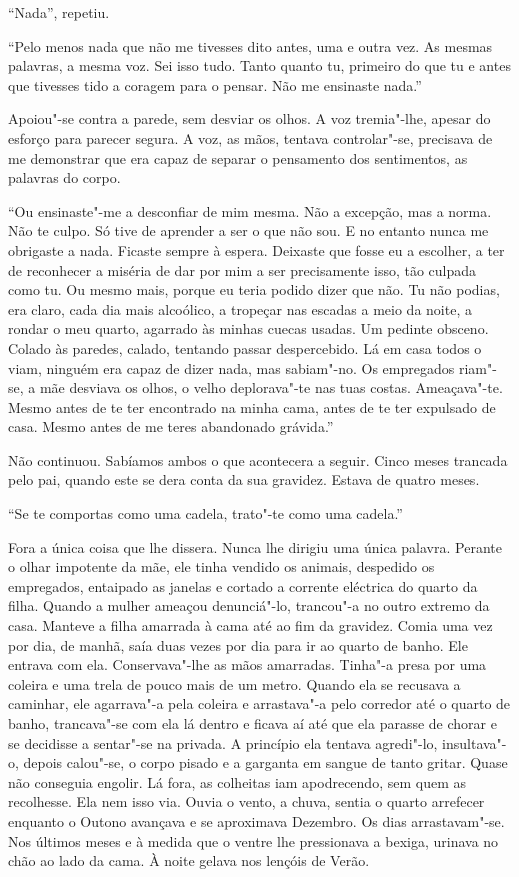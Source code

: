 ``Nada'',
repetiu.

``Pelo menos nada que não me tivesses dito antes, uma e outra vez. As
mesmas palavras, a mesma voz. Sei isso tudo. Tanto quanto tu, primeiro
do que tu e antes que tivesses tido a coragem para o pensar. Não me
ensinaste nada.''

Apoiou"-se contra a parede, sem desviar os olhos. A voz tremia"-lhe,
apesar do esforço para parecer segura. A voz, as mãos, tentava
controlar"-se, precisava de me demonstrar que era capaz de separar o
pensamento dos sentimentos, as palavras do corpo.

``Ou ensinaste"-me a desconfiar de mim mesma. Não a excepção, mas a
norma. Não te culpo. Só tive de aprender a ser o que não sou. E no
entanto nunca me obrigaste a nada. Ficaste sempre à espera. Deixaste que
fosse eu a escolher, a ter de reconhecer a miséria de dar por mim a ser
precisamente isso, tão culpada como tu. Ou mesmo mais, porque eu teria
podido dizer que não. Tu não podias, era claro, cada dia mais alcoólico,
a tropeçar nas escadas a meio da noite, a rondar o meu quarto, agarrado
às minhas cuecas usadas. Um pedinte obsceno. Colado às paredes, calado,
tentando passar despercebido. Lá em casa todos o viam, ninguém era capaz
de dizer nada, mas sabiam"-no. Os empregados riam"-se, a mãe desviava os
olhos, o velho deplorava"-te nas tuas costas. Ameaçava"-te. Mesmo antes
de te ter encontrado na minha cama, antes de te ter expulsado de casa.
Mesmo antes de me teres abandonado grávida.''

Não continuou. Sabíamos ambos o que acontecera a seguir. Cinco meses
trancada pelo pai, quando este se dera conta da sua gravidez. Estava de
quatro meses.

``Se te comportas como uma cadela, trato"-te como uma cadela.''

Fora a única coisa que lhe dissera. Nunca lhe dirigiu uma única palavra.
Perante o olhar impotente da mãe, ele tinha vendido os animais,
despedido os empregados, entaipado as janelas e cortado a corrente
eléctrica do quarto da filha. Quando a mulher ameaçou denunciá"-lo,
trancou"-a no outro extremo da casa. Manteve a filha amarrada à cama até
ao fim da gravidez. Comia uma vez por dia, de manhã, saía duas vezes por
dia para ir ao quarto de banho. Ele entrava com ela. Conservava"-lhe as
mãos amarradas. Tinha"-a presa por uma coleira e uma trela de pouco mais
de um metro. Quando ela se recusava a caminhar, ele agarrava"-a pela
coleira e arrastava"-a pelo corredor até o quarto de banho,
trancava"-se com ela lá dentro e ficava aí até que ela parasse de chorar
e se decidisse a sentar"-se na privada. A princípio ela tentava
agredi"-lo, insultava"-o, depois calou"-se, o corpo pisado e a garganta
em sangue de tanto gritar. Quase não conseguia engolir. Lá fora, as
colheitas iam apodrecendo, sem quem as recolhesse. Ela nem isso via.
Ouvia o vento, a chuva, sentia o quarto arrefecer enquanto o Outono
avançava e se aproximava Dezembro. Os dias arrastavam"-se. Nos últimos
meses e à medida que o ventre lhe pressionava a bexiga, urinava no chão
ao lado da cama. À noite gelava nos lençóis de Verão.

